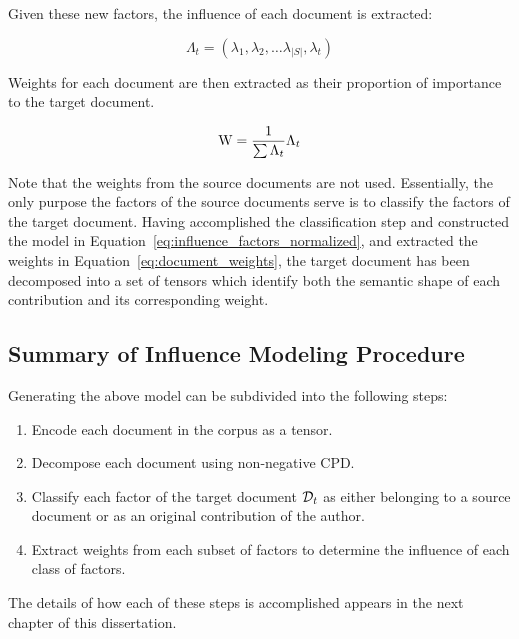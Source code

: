 \documentclass[../dissertation.tex]{subfiles}
\begin{document}
Given these new factors, the influence of each document is extracted:

\begin{equation} \label{eq:document_lambda}
  \Lambda_t = (\lambda_1, \lambda_2, \ldots \lambda_{|S|}, \lambda_t)
\end{equation}

Weights for each document are then extracted as their proportion of
importance to the target document.

\begin{equation} \label{eq:document_weights}
  \mathrm{W} = \dfrac{1}{\sum \Lambda_t} \Lambda_t
\end{equation}

Note that the weights from the source documents are not used.
Essentially, the only purpose the factors of the source documents
serve is to classify the factors of the target document.  Having
accomplished the classification step and constructed the model in
Equation~\ref{eq:influence_factors_normalized}, and extracted the
weights in Equation~\ref{eq:document_weights}, the target document has
been decomposed into a set of tensors which identify both the semantic
shape of each contribution and its corresponding weight.

\subsection{Summary of Influence Modeling Procedure}
Generating the above model can be subdivided into the following steps:

\begin{enumerate}
\item Encode each document in the corpus as a tensor.
\item Decompose each document using non-negative CPD.
\item Classify each factor of the target document $\mathcal{D}_t$ as
  either belonging to a source document or as an original contribution
  of the author.
\item Extract weights from each subset of factors to determine the
  influence of each class of factors.
\end{enumerate}

The details of how each of these steps is accomplished appears in the
next chapter of this dissertation.
\end{document}
